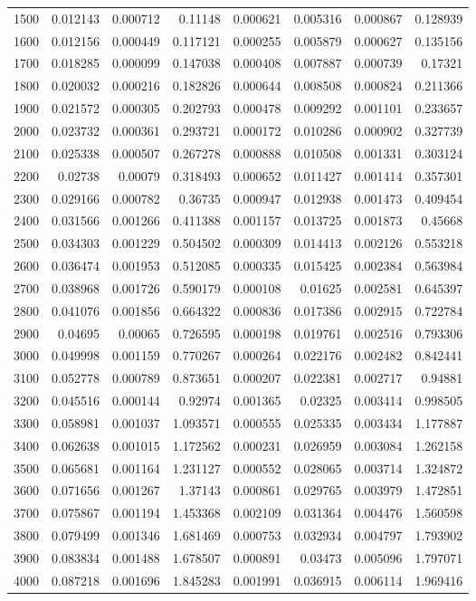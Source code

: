 \begin{longtable}{r r r r r r r r}
1500 & 0.012143 & 0.000712 & 0.11148 & 0.000621 & 0.005316 & 0.000867 & 0.128939 \\
1600 & 0.012156 & 0.000449 & 0.117121 & 0.000255 & 0.005879 & 0.000627 & 0.135156 \\
1700 & 0.018285 & 0.000099 & 0.147038 & 0.000408 & 0.007887 & 0.000739 & 0.17321 \\
1800 & 0.020032 & 0.000216 & 0.182826 & 0.000644 & 0.008508 & 0.000824 & 0.211366 \\
1900 & 0.021572 & 0.000305 & 0.202793 & 0.000478 & 0.009292 & 0.001101 & 0.233657 \\
2000 & 0.023732 & 0.000361 & 0.293721 & 0.000172 & 0.010286 & 0.000902 & 0.327739 \\
2100 & 0.025338 & 0.000507 & 0.267278 & 0.000888 & 0.010508 & 0.001331 & 0.303124 \\
2200 & 0.02738 & 0.00079 & 0.318493 & 0.000652 & 0.011427 & 0.001414 & 0.357301 \\
2300 & 0.029166 & 0.000782 & 0.36735 & 0.000947 & 0.012938 & 0.001473 & 0.409454 \\
2400 & 0.031566 & 0.001266 & 0.411388 & 0.001157 & 0.013725 & 0.001873 & 0.45668 \\
2500 & 0.034303 & 0.001229 & 0.504502 & 0.000309 & 0.014413 & 0.002126 & 0.553218 \\
2600 & 0.036474 & 0.001953 & 0.512085 & 0.000335 & 0.015425 & 0.002384 & 0.563984 \\
2700 & 0.038968 & 0.001726 & 0.590179 & 0.000108 & 0.01625 & 0.002581 & 0.645397 \\
2800 & 0.041076 & 0.001856 & 0.664322 & 0.000836 & 0.017386 & 0.002915 & 0.722784 \\
2900 & 0.04695 & 0.00065 & 0.726595 & 0.000198 & 0.019761 & 0.002516 & 0.793306 \\
3000 & 0.049998 & 0.001159 & 0.770267 & 0.000264 & 0.022176 & 0.002482 & 0.842441 \\
3100 & 0.052778 & 0.000789 & 0.873651 & 0.000207 & 0.022381 & 0.002717 & 0.94881 \\
3200 & 0.045516 & 0.000144 & 0.92974 & 0.001365 & 0.02325 & 0.003414 & 0.998505 \\
3300 & 0.058981 & 0.001037 & 1.093571 & 0.000555 & 0.025335 & 0.003434 & 1.177887 \\
3400 & 0.062638 & 0.001015 & 1.172562 & 0.000231 & 0.026959 & 0.003084 & 1.262158 \\
3500 & 0.065681 & 0.001164 & 1.231127 & 0.000552 & 0.028065 & 0.003714 & 1.324872 \\
3600 & 0.071656 & 0.001267 & 1.37143 & 0.000861 & 0.029765 & 0.003979 & 1.472851 \\
3700 & 0.075867 & 0.001194 & 1.453368 & 0.002109 & 0.031364 & 0.004476 & 1.560598 \\
3800 & 0.079499 & 0.001346 & 1.681469 & 0.000753 & 0.032934 & 0.004797 & 1.793902 \\
3900 & 0.083834 & 0.001488 & 1.678507 & 0.000891 & 0.03473 & 0.005096 & 1.797071 \\
4000 & 0.087218 & 0.001696 & 1.845283 & 0.001991 & 0.036915 & 0.006114 & 1.969416 \\
\end{longtable}

